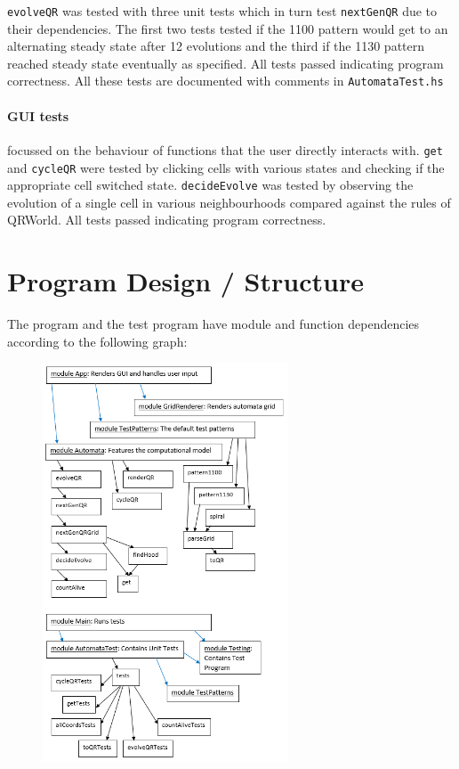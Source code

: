 \documentclass[11pt]{article}
\begin{document}
 \verb|evolveQR| was tested with three unit tests which in turn test \verb|nextGenQR| due to their dependencies. The first two tests tested if the 1100 pattern would get to an alternating steady state after 12 evolutions and the third if the 1130 pattern reached steady state eventually as specified. All tests passed indicating program correctness. All these tests are documented with comments in \verb|AutomataTest.hs|
\paragraph{GUI tests} focussed on the behaviour of functions that the user directly interacts with. \verb|get| and \verb|cycleQR| were tested by clicking cells with various states and checking if the appropriate cell switched state. \verb|decideEvolve| was tested by observing the evolution of a single cell in various neighbourhoods compared against the rules of QRWorld. All tests passed indicating program correctness.
\newpage
\section{Program Design / Structure}
The program and the test program have module and function dependencies according to the following graph: 
  \begin{figure}[H]
    \centering
    \includegraphics[width=0.65\textwidth]{funcDep.png}
  \end{figure}
\end{document}

